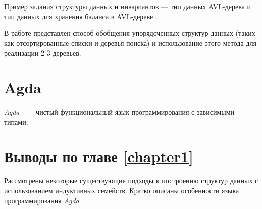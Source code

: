 Пример задания структуры данных и инвариантов —
тип данных AVL-дерева и тип данных для хранения баланса в AVL-дереве \cite{AVLTree}.



В работе \cite{McBridePivotal} представлен способ обобщения
упорядоченных структур данных
(таких как отсортированные списки и деревья поиска)
и использование этого метода для реализации 2-3 деревьев.

\section{Agda}
\emph{Agda}~\cite{AgdaLang}~---  чистый функциональный язык программирования с зависимыми типами.


\section{Выводы по главе \ref{chapter1}}

Рассмотрены некоторые существующие подходы к построению структур данных
с использованием индуктивных семейств.
Кратко описаны особенности языка программирования \textit{Agda}.
